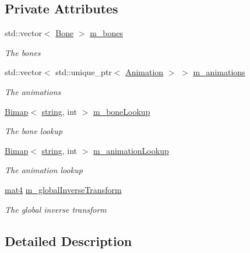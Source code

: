 \subsection*{Private Attributes}
\begin{DoxyCompactItemize}
\item 
std\+::vector$<$ \hyperlink{struct_bone}{Bone} $>$ \hyperlink{class_skeleton_a62748e7093e45f6f7788830afe25e168}{m\+\_\+bones}
\begin{DoxyCompactList}\small\item\em The bones \end{DoxyCompactList}\item 
std\+::vector$<$ std\+::unique\+\_\+ptr$<$ \hyperlink{class_animation}{Animation} $>$ $>$ \hyperlink{class_skeleton_a8332723240466214376407613a11f4ce}{m\+\_\+animations}
\begin{DoxyCompactList}\small\item\em The animations \end{DoxyCompactList}\item 
\hyperlink{class_bimap}{Bimap}$<$ \hyperlink{_types_8h_ad453f9f71ce1f9153fb748d6bb25e454}{string}, int $>$ \hyperlink{class_skeleton_aea181d3c2cd294fbf7c9cabb92f1fa19}{m\+\_\+bone\+Lookup}
\begin{DoxyCompactList}\small\item\em The bone lookup \end{DoxyCompactList}\item 
\hyperlink{class_bimap}{Bimap}$<$ \hyperlink{_types_8h_ad453f9f71ce1f9153fb748d6bb25e454}{string}, int $>$ \hyperlink{class_skeleton_a5dcba0b9955626744dc1a7efa35b5800}{m\+\_\+animation\+Lookup}
\begin{DoxyCompactList}\small\item\em The animation lookup \end{DoxyCompactList}\item 
\hyperlink{_types_8h_a2db59f395fe82a7394c6324956c265d8}{mat4} \hyperlink{class_skeleton_a0811c767c720f15e9f8419828731c4bf}{m\+\_\+global\+Inverse\+Transform}
\begin{DoxyCompactList}\small\item\em The global inverse transform \end{DoxyCompactList}\end{DoxyCompactItemize}


\subsection{Detailed Description}


